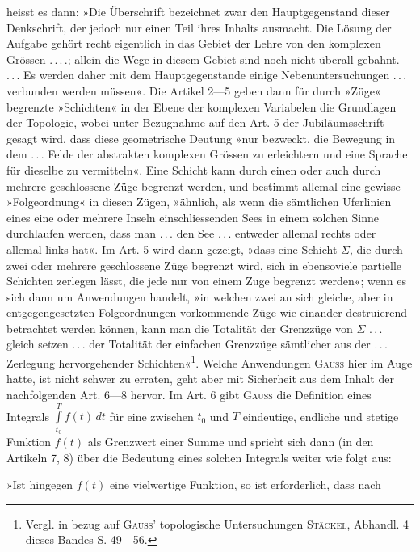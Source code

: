 \clearpage{}
\noindent heisst es dann: »Die Überschrift bezeichnet zwar den Hauptgegenstand dieser
Denkschrift, der jedoch nur einen Teil ihres Inhalts ausmacht. Die Lösung
der Aufgabe gehört recht eigentlich in das Gebiet der Lehre von den komplexen
Grössen \mbox{.\,.\,.\,.}; allein die Wege in diesem Gebiet sind noch nicht
überall gebahnt. \mbox{.\,.\,.} Es werden daher mit dem Hauptgegenstande einige
Nebenuntersuchungen \mbox{.\,.\,.} verbunden werden müssen«. Die Artikel 2—5 geben
dann für durch »Züge« begrenzte »Schichten« in der Ebene der komplexen
Variabelen die Grundlagen der Topologie, wobei unter Bezugnahme auf den
Art. 5 der Jubiläumsschrift gesagt wird, dass diese geometrische Deutung »nur
bezweckt, die Bewegung in dem \mbox{.\,.\,.} Felde der abstrakten komplexen Grössen
zu erleichtern und eine Sprache für dieselbe zu vermitteln«. Eine Schicht
kann durch einen oder auch durch mehrere geschlossene Züge begrenzt werden,
und bestimmt allemal eine gewisse »Folgeordnung« in diesen Zügen, »ähnlich,
als wenn die sämtlichen Uferlinien eines eine oder mehrere Inseln einschliessenden
Sees in einem solchen Sinne durchlaufen werden, dass man \mbox{.\,.\,.}
den See \mbox{.\,.\,.} entweder allemal rechts oder allemal links hat«. Im Art. 5
wird dann gezeigt, »dass eine Schicht \(\Sigma\), die durch zwei oder mehrere geschlossene
Züge begrenzt wird, sich in ebensoviele partielle Schichten zerlegen
lässt, die jede nur von einem Zuge begrenzt werden«; wenn es sich dann um
Anwendungen handelt, »in welchen zwei an sich gleiche, aber in entgegengesetzten
Folgeordnungen vorkommende Züge wie einander destruierend betrachtet
werden können, kann man die Totalität der Grenzzüge von \(\Sigma\) \mbox{.\,.\,.}
gleich setzen \mbox{.\,.\,.} der Totalität der einfachen Grenzzüge sämtlicher aus der
\mbox{.\,.\,.} Zerlegung hervorgehender Schichten«\footnote{Vergl. in bezug auf \textsc{Gauss'} topologische Untersuchungen \textsc{Stäckel}, Abhandl. 4 dieses Bandes S. 49—56.}. Welche Anwendungen \textsc{Gauss}
hier im Auge hatte, ist nicht schwer zu erraten, geht aber mit Sicherheit
aus dem Inhalt der nachfolgenden Art. 6—8 hervor. Im Art. 6 gibt \textsc{Gauss}
die Definition eines Integrals \(\displaystyle\int\limits_{t_0}^T f(t)\,dt\) für eine zwischen \(t_0\) und \(T\) eindeutige,
endliche und stetige Funktion \(f(t)\) als Grenzwert einer Summe und spricht
sich dann (in den Artikeln 7, 8) über die Bedeutung eines solchen Integrals
weiter wie folgt aus:
\par
»Ist hingegen \(f(t)\) eine vielwertige Funktion, so ist erforderlich, dass nach\par
